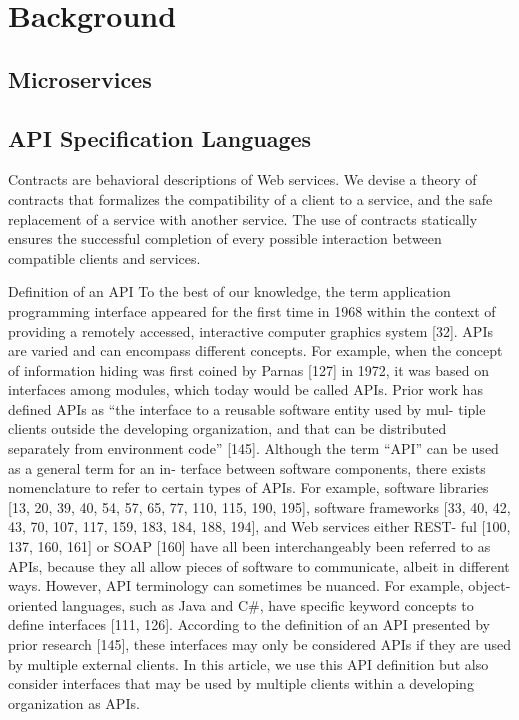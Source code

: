 
%

\chapter{Background}
\label{cha:background}

\section{Microservices} %
\label{sec:microservices}

\section{API Specification Languages} %
\label{sec:api_specification_languages}

Contracts are behavioral descriptions of Web services.
We devise a theory of contracts that
formalizes the compatibility of a client to a service, and the safe replacement of a service with
another service. The use of contracts statically ensures the successful completion of every possible
interaction between compatible clients and services.

Definition of an API
To the best of our knowledge, the term application programming interface appeared for the first
time in 1968 within the context of providing a remotely accessed, interactive computer graphics
system [32]. APIs are varied and can encompass different concepts. For example, when the concept
of information hiding was first coined by Parnas [127] in 1972, it was based on interfaces among
modules, which today would be called APIs.
Prior work has defined APIs as “the interface to a reusable software entity used by mul-
tiple clients outside the developing organization, and that can be distributed separately from
environment code” [145]. Although the term “API” can be used as a general term for an in-
terface between software components, there exists nomenclature to refer to certain types of
APIs. For example, software libraries [13, 20, 39, 40, 54, 57, 65, 77, 110, 115, 190, 195], software
frameworks [33, 40, 42, 43, 70, 107, 117, 159, 183, 184, 188, 194], and Web services either REST-
ful [100, 137, 160, 161] or SOAP [160] have all been interchangeably been referred to as APIs,
because they all allow pieces of software to communicate, albeit in different ways. However, API
terminology can sometimes be nuanced. For example, object-oriented languages, such as Java and
C#, have specific keyword concepts to define interfaces [111, 126]. According to the definition of
an API presented by prior research [145], these interfaces may only be considered APIs if they
are used by multiple external clients. In this article, we use this API definition but also consider
interfaces that may be used by multiple clients within a developing organization as APIs.

